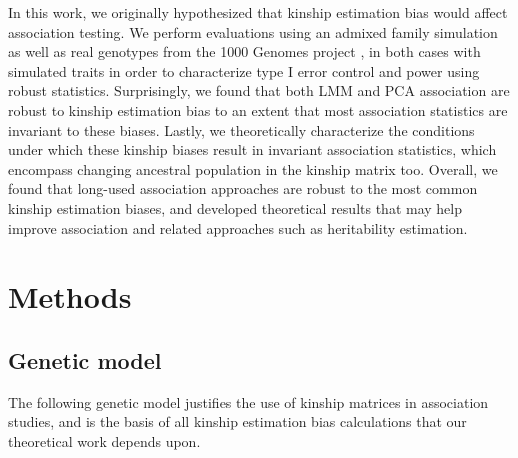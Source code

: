 \documentclass[11pt]{article}
\begin{document}
In this work, we originally hypothesized that kinship estimation bias would affect association testing.
We perform evaluations using an admixed family simulation \citep{yao_limitations_2022} as well as real genotypes from the 1000 Genomes project \citep{the_1000_genomes_project_consortium_map_2010, 1000_genomes_project_consortium_integrated_2012, fairley_international_2020}, in both cases with simulated traits in order to characterize type I error control and power using robust statistics.
Surprisingly, we found that both LMM and PCA association are robust to kinship estimation bias to an extent that most association statistics are invariant to these biases.
Lastly, we theoretically characterize the conditions under which these kinship biases result in invariant association statistics, which encompass changing ancestral population in the kinship matrix too.
Overall, we found that long-used association approaches are robust to the most common kinship estimation biases, and developed theoretical results that may help improve association and related approaches such as heritability estimation.


\section{Methods}

\subsection{Genetic model}

The following genetic model justifies the use of kinship matrices in association studies, and is the basis of all kinship estimation bias calculations that our theoretical work depends upon.
\end{document}
